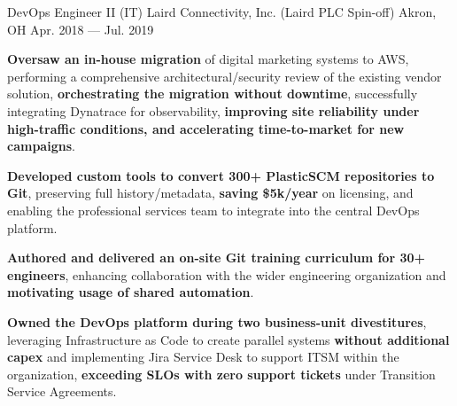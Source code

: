 \begin{cventries}
    \cventry
        { DevOps Engineer II (IT) }
        { Laird Connectivity, Inc. (Laird PLC Spin-off) }
        { Akron, OH }
        { Apr. 2018 --- Jul. 2019 }
        {
            \begin{cvitems}
                \item{\textbf{Oversaw an in-house migration} of digital marketing systems to AWS, performing a comprehensive architectural/security review of the existing vendor solution, \textbf{orchestrating the migration without downtime}, successfully integrating Dynatrace for observability, \textbf{improving site reliability under high-traffic conditions, and accelerating time-to-market for new campaigns}.}
                \item{\textbf{Developed custom tools to convert 300+ PlasticSCM repositories to Git}, preserving full history/metadata, \textbf{saving \$5k/year} on licensing, and enabling the professional services team to integrate into the central DevOps platform.}
                \item{\textbf{Authored and delivered an on-site Git training curriculum for 30+ engineers}, enhancing collaboration with the wider engineering organization and \textbf{motivating usage of shared automation}.}
                \item{\textbf{Owned the DevOps platform during two business-unit divestitures}, leveraging Infrastructure as Code to create parallel systems \textbf{without additional capex} and implementing Jira Service Desk to support ITSM within the organization, \textbf{exceeding SLOs with zero support tickets} under Transition Service Agreements.}
            \end{cvitems}
        }
\end{cventries}
